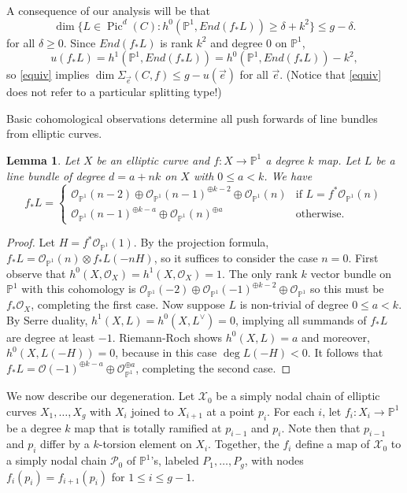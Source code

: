 \documentclass[12pt]{amsart}
\newcommand{\pp}{\mathbb{P}}
\renewcommand{\P}{\mathcal{P}}
\newcommand{\X}{\mathcal{X}}
\renewcommand{\O}{\mathscr{O}}
\newtheorem{Lemma}[theorem]{Lemma}
\DeclareMathOperator{\Pic}{Pic}
\theoremstyle{definition}
\theoremstyle{remark}
\theoremstyle{remark}
\numberwithin{equation}{section}
\begin{document}
 
 A consequence of our analysis will be that
\begin{equation} \label{equiv}
\dim\{L \in \Pic^d(C) : h^0(\pp^1, End(f_*L)) \geq \delta+k^2\} \leq g - \delta.
\end{equation}
for all $\delta \geq 0$. 
Since $End(f_*L)$ is rank $k^2$ and degree $0$ on $\pp^1$,
\[u(f_*L) = h^1(\pp^1, End(f_*L)) =  h^0(\pp^1, End(f_*L)) - k^2,\]
so \eqref{equiv} implies $\dim \Sigma_{\vec{e}}(C, f) \leq g - u(\vec{e})$ for all $\vec{e}$.
(Notice that \eqref{equiv} does not refer to a particular splitting type!)

Basic cohomological observations determine all push forwards of line bundles from elliptic curves.
\begin{Lemma} \label{ezpush}
Let $X$ be an elliptic curve and $f\colon  X \rightarrow \pp^1$ a degree $k$ map. Let $L$ be a line bundle of degree $d = a + nk$ on $X$ with $0 \leq a < k$. We have
\[f_*L = \begin{cases}  \O_{\pp^1}(n-2) \oplus \O_{\pp^1}(n-1)^{\oplus k-2} \oplus  \O_{\pp^1}(n) &\text{if $L = f^*\O_{\pp^1}(n)$} \\  \O_{\pp^1}(n-1)^{\oplus k-a} \oplus \O_{\pp^1}(n)^{\oplus a} &\text{otherwise.} \end{cases}\]
 \end{Lemma}
\begin{proof}
Let $H = f^*\O_{\pp^1}(1)$. By the projection formula, $f_* L = \O_{\pp^1}(n) \otimes f_* L(-nH)$, so it suffices to consider the case $n = 0$.
First observe that $h^0(X,\O_X) = h^1(X,\O_X) = 1$. The only rank $k$ vector bundle on $\pp^1$ with this cohomology is $\O_{\pp^1}(-2) \oplus \O_{\pp^1}(-1)^{\oplus k-2} \oplus \O_{\pp^1}$ so this must be $f_*\O_X$, completing the first case.
Now suppose $L$ is non-trivial of degree $0 \leq a < k$. By Serre duality, $h^1(X,L) = h^0(X,L^\vee) = 0$, implying all summands of $f_*L$ are degree at least $-1$. Riemann-Roch shows $h^0(X,L) = a$ and moreover, $h^0(X,L(-H)) = 0$, because in this case $\deg L(-H) < 0$. It follows that $f_*L = \O(-1)^{\oplus k-a} \oplus \O_{\pp^1}^{\oplus a}$, completing the second case.
\end{proof} 




We now describe our degeneration. Let $\X_0$ be a simply nodal chain of elliptic curves $X_1, \ldots, X_g$ with $X_i$ joined to $X_{i+1}$ at a point $p_i$.
For each $i$, let $f_i: X_i \rightarrow \pp^1$ be a degree $k$ map that is totally ramified at $p_{i-1}$ and $p_i$. 
Note then that $p_{i-1}$ and $p_{i}$ differ by a $k$-torsion element on $X_i$.
Together, the $f_i$ define a map of $\X_0$ to a simply nodal chain $\P_0$ of $\pp^1$'s, labeled $P_1, \ldots, P_g$, with nodes $f_i(p_i) = f_{i+1}(p_i)$ for $1 \leq i \leq g-1$.
\end{document}
